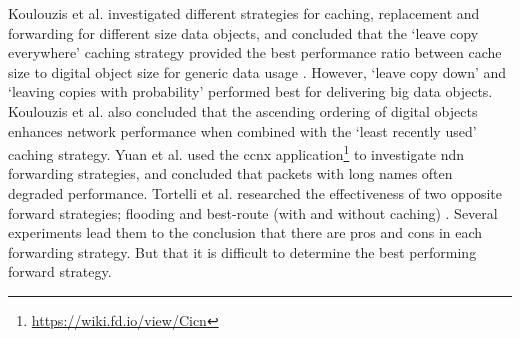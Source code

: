 \documentclass[conference]{IEEEtran}
\begin{document}
Koulouzis et al. investigated different strategies for caching, replacement and forwarding for different size data objects, and concluded that the `leave copy everywhere' caching strategy provided the best performance ratio between cache size to digital object size for generic data usage \cite{koulouzis2018information}. However, `leave copy down' and `leaving copies with probability' performed best for delivering big data objects. Koulouzis et al. also concluded that the ascending ordering of digital objects enhances network performance when combined with the `least recently used' caching strategy. Yuan et al. \cite{yuan2012scalable} used the \gls{ccnx} application\footnote{\url{https://wiki.fd.io/view/Cicn}} to investigate \gls{ndn} forwarding strategies, and concluded that packets with long names often degraded performance. Tortelli et al. researched the effectiveness of two opposite forward strategies; flooding and best-route (with and without caching) \cite{tortelli2013performance}. Several experiments lead them to the conclusion that there are pros and cons in each forwarding strategy. But that it is difficult to determine the best performing forward strategy. 
\end{document}
